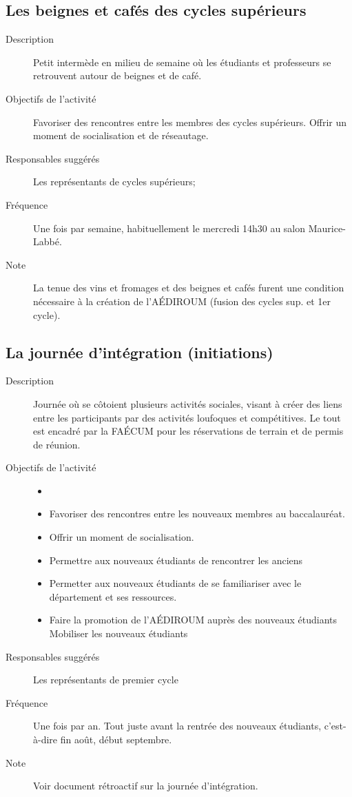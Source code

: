 \documentclass{aediroum}
\begin{document}
\subsection{Les beignes et cafés des cycles supérieurs}
\begin{description}
	\item[Description] Petit intermède en milieu de semaine où les étudiants et professeurs se retrouvent autour de beignes et de café.
	\item[Objectifs de l'activité] Favoriser des rencontres entre les membres des cycles supérieurs. Offrir un moment de socialisation et de réseautage.
	\item[Responsables suggérés] Les représentants de cycles supérieurs;
	\item[Fréquence] Une fois par semaine, habituellement le mercredi 14h30 au salon Maurice-Labbé.
	\item[Note] La tenue des vins et fromages et des beignes et cafés furent une condition nécessaire à la création de l'AÉDIROUM (fusion des cycles sup. et 1er cycle).
\end{description}

\subsection{La journée d'intégration (initiations)}
\begin{description}
	\item[Description] Journée où se côtoient plusieurs activités sociales, visant à créer des liens entre les participants par des activités loufoques et compétitives. Le tout est encadré par la FAÉCUM pour les réservations de terrain et de permis de réunion.
	\item[Objectifs de l'activité]
	\begin{itemize}
		\item[]
		\item Favoriser des rencontres entre les nouveaux membres au baccalauréat.
		\item Offrir un moment de socialisation.
		\item Permettre aux nouveaux étudiants de rencontrer les anciens
		\item Permetter aux nouveaux étudiants de se familiariser avec le département et ses ressources.
		\item Faire la promotion de l'AÉDIROUM auprès des nouveaux étudiants Mobiliser les nouveaux étudiants
	\end{itemize}
	\item[Responsables suggérés] Les représentants de premier cycle
	\item[Fréquence] Une fois par an. Tout juste avant la rentrée des nouveaux étudiants, c'est-à-dire fin août, début septembre.
	\item[Note] Voir document rétroactif sur la journée d'intégration.
\end{description}
\end{document}

